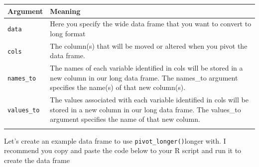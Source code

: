 \documentclass[
]{book}
\begin{document}
\begin{longtable}[]{@{}
  >{\raggedright\arraybackslash}p{}
  >{\raggedright\arraybackslash}p{}@{}}
\toprule\noalign{}
\begin{minipage}[b]{\linewidth}\raggedright
Argument
\end{minipage} & \begin{minipage}[b]{\linewidth}\raggedright
Meaning
\end{minipage} \\
\midrule\noalign{}
\endhead
\bottomrule\noalign{}
\endlastfoot
\texttt{data} & Here you specify the wide data frame that you want to convert to long format \\
\texttt{cols} & The column(s) that will be moved or altered when you pivot the data frame. \\
\texttt{names\_to} & The names of each variable identified in cols will be stored in a new column in our long data frame. The names\_to argument specifies the name(s) of that new column(s). \\
\texttt{values\_to} & The values associated with each variable identified in cols will be stored in a new column in our long data frame. The values\_to argument specifies the name of that new column. \\
& \\
\end{longtable}

Let's create an example data frame to use \texttt{pivot\_longer()}longer with. I recommend you copy and paste the code below to your R script and run it to create the data frame
\end{document}
